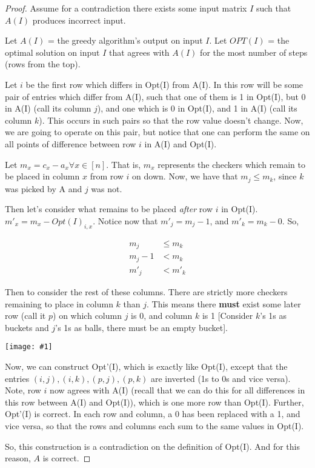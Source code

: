 \documentclass{article}
\providecommand{\image}[1]{
    \begin{center}
        \texttt{[image: \#1]}
    \end{center}
}
\begin{document}
	\begin{proof}
	Assume for a contradiction there exists some input matrix $I$ such that $A(I)$ produces incorrect input.
	
	Let $A(I)$ = the greedy algorithm's output on input $I$.
	Let $OPT(I)$ = the optimal solution on input $I$ that agrees
	with $A(I)$ for the most number of steps (rows from the top).
 	
    Let $i$ be the first row which differs in Opt(I) from A(I).
    In this row will be some pair of entries which differ from A(I), such that one of them is 1 in Opt(I), but 0 in A(I) (call its column $j$), and one which is 0 in Opt(I), and 1 in A(I) (call its column $k$).
    This occurs in such pairs so that the row value doesn't change.
    Now, we are going to operate on this pair, but notice that one can perform the same on all points of difference between row $i$ in A(I) and Opt(I).
    
    Let $m_x = c_x - a_x \forall x \in [n]$. That is, $m_x$ represents the checkers which remain to be placed in column $x$ from row $i$ on down.
    Now, we have that $m_j \leq m_k$, since $k$ was picked by A and $j$ was not.
    
    Then let's consider what remains to be placed \textit{after} row $i$ in Opt(I).
    $m'_x = m_x - Opt(I)_{i, x}$.
    Notice now that $m'_j = m_j - 1$, and $m'_k = m_k - 0$. So,
    
    \begin{align*}
    m_j &\leq m_k\\
    m_j - 1 &< m_k\\
    m'_j &< m'_k
    \end{align*}
    
    Then to consider the rest of these columns.
    There are strictly more checkers remaining to place in column $k$ than $j$.
    This means there \textbf{must} exist some later row (call it $p$) on which column $j$ is 0, and column $k$ is 1 [Consider $k$'s 1s as buckets and $j$'s 1s as balls, there must be an empty bucket].
    
    \image{p12mat}
    
    Now, we can construct Opt'(I), which is exactly like Opt(I), except that the entries $(i, j), (i, k), (p, j), (p, k)$ are inverted (1s to 0s and vice versa).
    Note, row $i$ now agrees with A(I) (recall that we can do this for all differences in this row between A(I) and Opt(I)), which is one more row than Opt(I).
    Further, Opt'(I) is correct.
    In each row and column, a 0 has been replaced with a 1, and vice versa, so that the rows and columns each sum to the same values in Opt(I).
    
    So, this construction is a contradiction on the definition of Opt(I).
    And for this reason, $A$ is correct.
	\end{proof}
\end{document}
